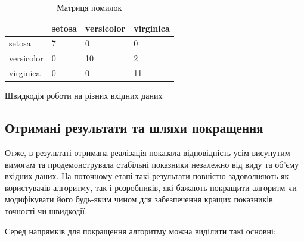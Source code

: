 \begin{table}[h!]
	\begin{tabularx}{\textwidth}{|X|X|X|X|}
    \hline
     & setosa & versicolor & virginica \\ \hline
    setosa & 7 & 0 & 0 \\ \hline
    versicolor & 0 & 10 & 2 \\ \hline
    virginica & 0 & 0 & 11 \\
    \hline
    \end{tabularx}
\caption{Матриця помилок} \label{tab:confusion_matrix}
\end{table}

Швидкодія роботи на різних вхідних даних
 \subsection{Отримані результати та шляхи покращення}
 Отже, в результаті отримана реалізація показала відповідність усім висунутим вимогам та продемонструвала стабільні показники незалежно від виду та об'єму вхідних даних. На поточному етапі такі результати повністю задоволняють як користувачів алгоритму, так і розробників, які бажають покращити алгоритм чи модифікувати його будь-яким чином для забезпечення кращих показників точності чи швидкодії.

Серед напрямків для покращення алгоритму можна виділити такі основні:

